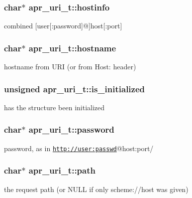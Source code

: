 \subsubsection[{\texorpdfstring{hostinfo}{hostinfo}}]{\setlength{\rightskip}{0pt plus 5cm}char$\ast$ apr\+\_\+uri\+\_\+t\+::hostinfo}\hypertarget{structapr__uri__t_a985b18875320d40cdb33d722ecf20ac2}{}\label{structapr__uri__t_a985b18875320d40cdb33d722ecf20ac2}
combined \mbox{[}user\mbox{[}\+:password\mbox{]}@\mbox{]}host\mbox{[}\+:port\mbox{]} 
\subsubsection[{\texorpdfstring{hostname}{hostname}}]{\setlength{\rightskip}{0pt plus 5cm}char$\ast$ apr\+\_\+uri\+\_\+t\+::hostname}\hypertarget{structapr__uri__t_a8c6bf3dfca3d159f091377d9f7228aec}{}\label{structapr__uri__t_a8c6bf3dfca3d159f091377d9f7228aec}
hostname from U\+RI (or from Host\+: header) 
\subsubsection[{\texorpdfstring{is\+\_\+initialized}{is_initialized}}]{\setlength{\rightskip}{0pt plus 5cm}unsigned apr\+\_\+uri\+\_\+t\+::is\+\_\+initialized}\hypertarget{structapr__uri__t_a6f77dda6db6c31c2c3652f6026ea6b73}{}\label{structapr__uri__t_a6f77dda6db6c31c2c3652f6026ea6b73}
has the structure been initialized 
\subsubsection[{\texorpdfstring{password}{password}}]{\setlength{\rightskip}{0pt plus 5cm}char$\ast$ apr\+\_\+uri\+\_\+t\+::password}\hypertarget{structapr__uri__t_a7eabf4f785f98a12762076f7519d3959}{}\label{structapr__uri__t_a7eabf4f785f98a12762076f7519d3959}
password, as in \href{http://user:passwd}{\tt http\+://user\+:passwd}@host\+:port/ 
\subsubsection[{\texorpdfstring{path}{path}}]{\setlength{\rightskip}{0pt plus 5cm}char$\ast$ apr\+\_\+uri\+\_\+t\+::path}\hypertarget{structapr__uri__t_a61cff1baadb3c1b52a34b502c25bba7f}{}\label{structapr__uri__t_a61cff1baadb3c1b52a34b502c25bba7f}
the request path (or N\+U\+LL if only scheme\+://host was given) 
